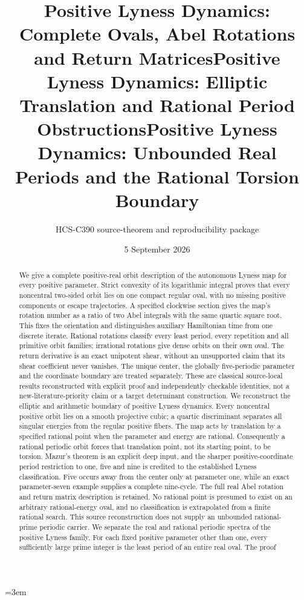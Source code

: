 \documentclass[10pt]{article}
\title{Positive Lyness Dynamics: Complete Ovals, Abel Rotations and Return Matrices}
\title{Positive Lyness Dynamics: Elliptic Translation and Rational Period Obstructions}
\title{Positive Lyness Dynamics: Unbounded Real Periods and the Rational Torsion Boundary}
\author{HCS-C390 source-theorem and reproducibility package}
\date{5 September 2026}
\begin{document}
\emergencystretch=3em
\maketitle
\begin{abstract}
\ifcase\CRevisionRound
We give a complete positive-real orbit description of the autonomous Lyness
map for every positive parameter. Strict convexity of its logarithmic
integral proves that every noncentral two-sided orbit lies on one compact
regular oval, with no missing positive components or escape trajectories.
A specified clockwise section gives the map's rotation number as a ratio
of two Abel integrals with the same quartic square root. This fixes the
orientation and distinguishes auxiliary Hamiltonian time from one discrete
iterate. Rational rotations classify every least period, every repetition
and all primitive orbit families; irrational rotations give dense orbits
on their own oval. The return derivative is an exact unipotent shear,
without an unsupported claim that its shear coefficient never vanishes.
The unique center, the globally five-periodic parameter and the coordinate
boundary are treated separately. These are classical source-local results
reconstructed with explicit proof and independently checkable identities,
not a new-literature-priority claim or a target determinant construction.
\or
We reconstruct the elliptic and arithmetic boundary of positive Lyness
dynamics. Every noncentral positive orbit lies on a smooth projective
cubic; a quartic discriminant separates all singular energies from the
regular positive fibers. The map acts by translation by a specified
rational point when the parameter and energy are rational. Consequently
a rational periodic orbit forces that translation point, not its starting
point, to be torsion. Mazur's theorem is an explicit deep input, and the
sharper positive-coordinate period restriction to one, five and nine is
credited to the established Lyness classification. Five occurs away from
the center only at parameter one, while an exact parameter-seven example
supplies a complete nine-cycle. The full real Abel rotation and return
matrix description is retained. No rational point is presumed to exist
on an arbitrary rational-energy oval, and no classification is extrapolated
from a finite rational search. This source reconstruction does not supply
an unbounded rational-prime periodic carrier.
\else
We separate the real and rational periodic spectra of the positive Lyness
family. For each fixed positive parameter other than one, every sufficiently
large prime integer is the least period of an entire real oval. The proof

\end{abstract}
\end{document}
